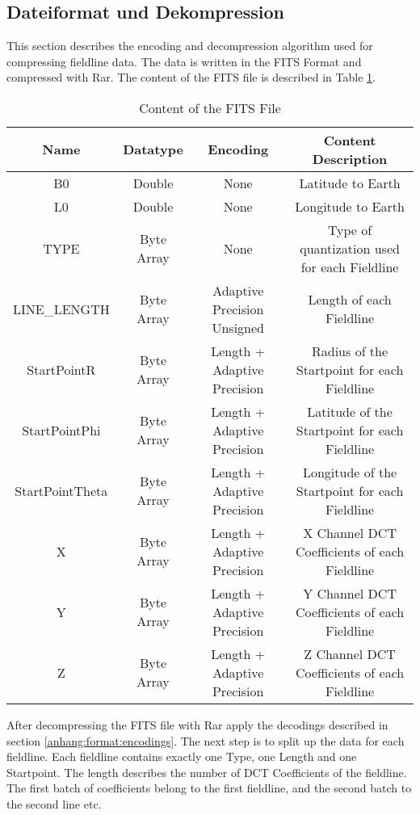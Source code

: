 \subsection*{Dateiformat und Dekompression}
This section describes the encoding and decompression algorithm used for compressing fieldline data. The data is written in the FITS Format \cite{website:fits} and compressed with Rar. The content of the FITS file is described in Table \ref{anhang:format:content}.\\
\begin{table}[!htbp]
\center
\begin{tabular}{|c|c|c|c|}
	\hline
	Name  & Datatype & Encoding& Content Description	\\\hline
    B0 & Double & None & Latitude to Earth\\
    L0 & Double& None& Longitude to Earth\\
    TYPE & Byte Array & None & Type of quantization used for each Fieldline\\
    LINE\_LENGTH &Byte Array & Adaptive Precision Unsigned & Length of each Fieldline\\
    StartPointR & Byte Array & Length + Adaptive Precision & Radius of the Startpoint for each Fieldline\\
    StartPointPhi & Byte Array & Length + Adaptive Precision & Latitude of the Startpoint for each Fieldline\\
    StartPointTheta & Byte Array & Length  + Adaptive Precision & Longitude of the Startpoint for each Fieldline\\
    X & Byte Array & Length + Adaptive Precision & X Channel DCT Coefficients of each Fieldline\\
    Y & Byte Array & Length + Adaptive Precision & Y Channel DCT Coefficients of each Fieldline\\
    Z & Byte Array & Length + Adaptive Precision & Z Channel DCT Coefficients of each Fieldline\\\hline
\end{tabular}
\caption{Content of the FITS File}
\label{anhang:format:content}
\end{table}
After decompressing the FITS file with Rar apply the decodings described in section \ref{anhang:format:encodings}. The next step is to split up the data for each fieldline. Each fieldline contains exactly one Type, one Length and one Startpoint. The length describes the number of DCT Coefficients of the fieldline. The first batch of coefficients belong to the first fieldline, and the second batch to the second line etc.\\
